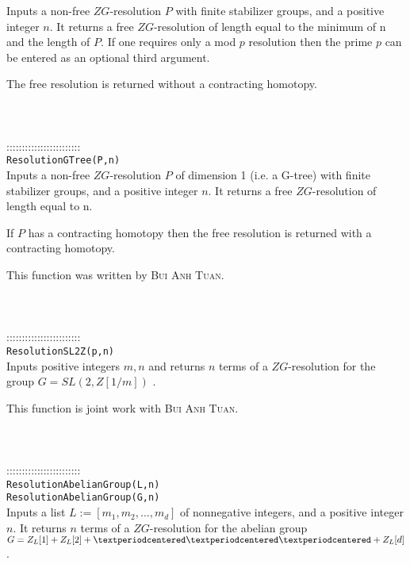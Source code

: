 \documentclass[a4paper,11pt]{report}
\begin{document}
{ Inputs a non-free $ZG$-resolution $P$ with finite stabilizer groups, and a positive integer $n$. It returns a free $ZG$-resolution of length equal to the minimum of n and the length of $P$. If one requires only a mod $p$ resolution then the prime $p$ can be entered as an optional third argument. 

 The free resolution is returned without a contracting homotopy. \\
 \\
 \\
 \\
 ::::::::::::::::::::::::\\
 \texttt{ResolutionGTree(P,n)}\\
 

 Inputs a non-free $ZG$-resolution $P$ of dimension 1 (i.e. a G-tree) with finite stabilizer groups, and a positive
integer $n$. It returns a free $ZG$-resolution of length equal to n. 

 If $P$ has a contracting homotopy then the free resolution is returned with a
contracting homotopy. 

 This function was written by \textsc{ Bui Anh Tuan}. \\
 \\
 \\
 \\
 ::::::::::::::::::::::::\\
 \texttt{ResolutionSL2Z(p,n)}\\
 

 Inputs positive integers $m, n$ and returns $n$ terms of a $ZG$-resolution for the group $G=SL(2,Z[1/m])$ . 

 

 This function is joint work with \textsc{Bui Anh Tuan}. \\
 \\
 \\
 \\
 ::::::::::::::::::::::::\\
 \texttt{ResolutionAbelianGroup(L,n)}\\
 \texttt{ResolutionAbelianGroup(G,n)}\\
 

 Inputs a list $L:=[m_1,m_2, ..., m_d]$ of nonnegative integers, and a positive integer $n$. It returns $n$ terms of a $ZG$-resolution for the abelian group $G=Z_L[1]+Z_L[2]+{\textperiodcentered}{\textperiodcentered}{\textperiodcentered}+Z_L[d]$ . 

}
\end{document}
